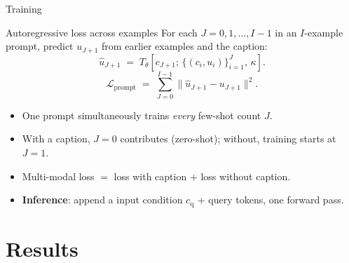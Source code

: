 \documentclass[10pt,aspectratio=169]{beamer}
\begin{document}
\begin{frame}{Training}
  \begin{block}{Autoregressive loss across examples}
    For each $J = 0,1,\dots,I-1$ in an $I$-example prompt, predict $u_{J+1}$ from earlier examples and the caption:
    \[
      \hat{u}_{J+1} \;=\; T_\theta\!\left[c_{J+1};\,\{(c_i,u_i)\}_{i=1}^{J},\,\kappa\right].
    \]
    \[
      \mathcal{L}_{\text{prompt}} \;=\; \sum_{J=0}^{I-1}\bigl\lVert\hat{u}_{J+1}-u_{J+1}\bigr\rVert^2.
    \]
  \end{block}
\begin{itemize}\setlength\itemsep{0.1em}
    \item One prompt simultaneously trains \emph{every} few-shot count $J$.
    \item With a caption, $J=0$ contributes (zero-shot); without, training starts at $J=1$.
    \item Multi-modal loss $=$ loss with caption $+$ loss without caption.
    \item \textbf{Inference}: append a input condition $c_{\text{q}}$ + query tokens, one forward pass.
  \end{itemize}
\end{frame}


\section{Results}
\end{document}

